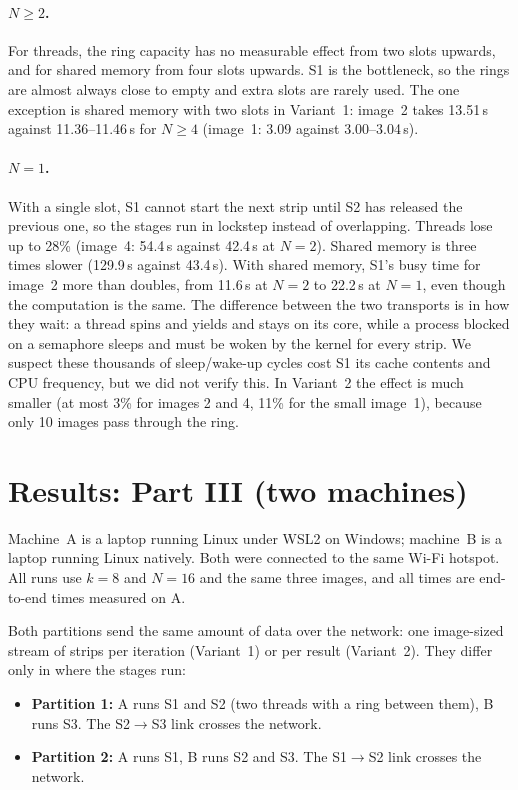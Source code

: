 \documentclass[11pt,a4paper]{article}
\newcommand{\cfgK}{8}
\newcommand{\cfgRing}{16}
\newcommand{\cfgResults}{10}
\begin{document}
\paragraph{$N \ge 2$.} For threads, the ring capacity has no measurable effect from two slots
upwards, and for shared memory from four slots upwards. S1 is the bottleneck, so the rings are
almost always close to empty and extra slots are rarely used. The one exception is shared memory
with two slots in Variant~1: image~2 takes 13.51\,s against 11.36--11.46\,s for $N\ge4$ (image~1:
3.09 against 3.00--3.04\,s).

\paragraph{$N = 1$.} With a single slot, S1 cannot start the next strip until S2 has released the
previous one, so the stages run in lockstep instead of overlapping. Threads lose up to 28\%
(image~4: 54.4\,s against 42.4\,s at $N=2$). Shared memory is three times slower (129.9\,s
against 43.4\,s). With shared memory, S1's busy time for image~2 more than doubles, from 11.6\,s at
$N=2$ to 22.2\,s at $N=1$, even though the computation is the same. The difference between the
two transports is in how they wait: a thread spins and yields and stays on its core, while a
process blocked on a semaphore sleeps and must be woken by the kernel for every strip. We suspect
these thousands of sleep/wake-up cycles cost S1 its cache contents and CPU frequency, but we did
not verify this. In Variant~2 the effect is much smaller (at most 3\% for images 2 and 4, 11\%
for the small image~1), because only \cfgResults{} images pass through the ring.

\section{Results: Part III (two machines)}
Machine~A is a laptop running Linux under WSL2 on Windows; machine~B is a laptop running Linux
natively. Both were connected to the same Wi-Fi hotspot. All runs use $k=\cfgK$ and $N=\cfgRing$
and the same three images, and all times are end-to-end times measured on A.

Both partitions send the same amount of data over the network: one image-sized stream of strips
per iteration (Variant~1) or per result (Variant~2). They differ only in where the stages run:
\begin{itemize}
\item \textbf{Partition 1:} A runs S1 and S2 (two threads with a ring between them), B runs S3.
  The S2$\to$S3 link crosses the network.
\item \textbf{Partition 2:} A runs S1, B runs S2 and S3. The S1$\to$S2 link crosses the network.
\end{itemize}
\end{document}
